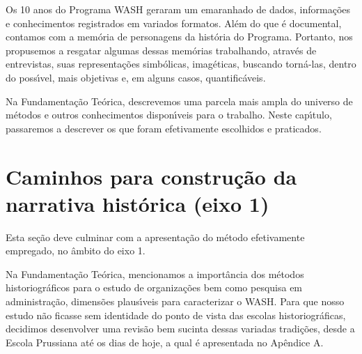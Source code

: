 \documentclass[
12pt,		%
openright,	%
twoside,  %
a4paper,			%
chapter=TITLE,		%
english,			%
french,				%
spanish,			%
brazil				%
]{USPSC-classe/USPSC}
\begin{document}
Os 10 anos do Programa WASH geraram um emaranhado de dados, informa\c{c}\~oes e conhecimentos registrados em variados formatos. Al\'em do que \'e documental, contamos com a mem\'oria de personagens da hist\'oria do Programa. Portanto, nos propusemos a resgatar algumas dessas mem\'orias trabalhando, atrav\'es de entrevistas, suas representa\c{c}\~oes simb\'olicas, imag\'eticas, buscando torn\'a-las, dentro do poss\'{\i}vel, mais objetivas e, em alguns casos, quantific\'aveis.

















Na Fundamenta\c{c}\~ao Te\'orica, descrevemos uma parcela mais ampla do universo de m\'etodos e outros conhecimentos dispon\'{\i}veis para o trabalho. Neste cap\'{\i}tulo, passaremos a descrever os que foram efetivamente escolhidos e praticados.

















\section[Caminhos para constru\c{c}\~ao da narrativa hist\'orica (eixo 1)]{Caminhos para constru\c{c}\~ao da narrativa hist\'orica (eixo 1)}\label{Caminhos para constru\c{c}\~ao da narrativa hist\'orica (eixo 1)}
Esta se\c{c}\~ao deve culminar com a apresenta\c{c}\~ao do m\'etodo efetivamente empregado, no \^ambito do eixo 1.

















Na Fundamenta\c{c}\~ao Te\'orica, mencionamos a import\^ancia dos m\'etodos historiogr\'aficos para o estudo de organiza\c{c}\~oes bem como pesquisa em administra\c{c}\~ao, dimens\~oes plaus\'{\i}veis para caracterizar o WASH. Para que nosso estudo n\~ao ficasse sem identidade do ponto de vista das escolas historiogr\'aficas, decidimos desenvolver uma revis\~ao bem sucinta dessas variadas tradi\c{c}\~oes, desde a Escola Prussiana at\'e os dias de hoje, a qual \'e apresentada no Ap\^endice A.
\end{document}
